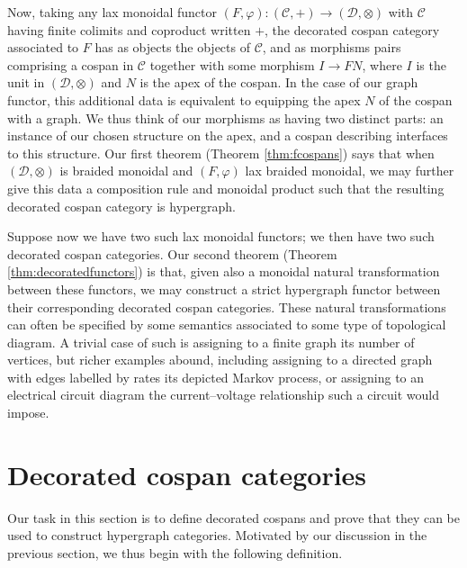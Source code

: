 Now, taking any lax monoidal functor $(F,\varphi)\colon  (\mathcal C,+) \to (\mathcal
D,\otimes)$ with $\mathcal C$ having finite colimits and coproduct written $+$,
the decorated cospan category associated to $F$ has as objects the objects of
$\mathcal C$, and as morphisms pairs comprising a cospan in $\mathcal C$
together with some morphism $I \to FN$, where $I$ is the unit in $(\mathcal
D,\otimes)$ and $N$ is the apex of the cospan. In the case of our graph
functor, this additional data is equivalent to equipping the apex $N$ of the
cospan with a graph. We thus think of our morphisms as having two distinct
parts: an instance of our chosen structure on the apex, and a cospan describing
interfaces to this structure. Our first theorem (Theorem \ref{thm:fcospans})
says that when $(\mathcal D,\otimes)$ is braided monoidal and $(F,\varphi)$ lax
braided monoidal, we may further give this data a composition rule and monoidal
product such that the resulting decorated cospan category is hypergraph.  

Suppose now we have two such lax monoidal functors; we then have two such
decorated cospan categories. Our second theorem (Theorem
\ref{thm:decoratedfunctors}) is that, given also a monoidal natural
transformation between these functors, we may construct a strict hypergraph
functor between their corresponding decorated cospan categories.  These natural
transformations can often be specified by some semantics associated to some type
of topological diagram. A trivial case of such is assigning to a finite graph
its number of vertices, but richer examples abound, including assigning to a
directed graph with edges labelled by rates its depicted Markov process, or
assigning to an electrical circuit diagram the current--voltage relationship
such a circuit would impose.

\section{Decorated cospan categories} \label{sec:dcc}
Our task in this section is to define decorated cospans and prove that they can
be used to construct hypergraph categories. Motivated by our discussion in the
previous section, we thus begin with the following definition.

